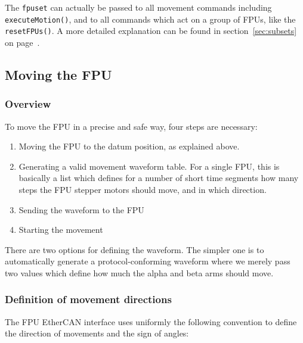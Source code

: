 \documentclass[11pt,a4paper]{report}
\begin{document}
The \texttt{fpuset} can actually be passed to all movement commands
including \texttt{executeMotion()}, and to all commands which act on a
group of FPUs, like the \texttt{resetFPUs()}. A more detailed
explanation can be found in section~\ref{sec:subsets} on
page~\pageref{sec:subsets}.


\subsection{Moving the FPU}
\subsubsection{Overview}
To move the FPU in a precise and safe way, four steps are necessary:

\begin{enumerate}
\item Moving the FPU to the datum position, as explained above.

\item Generating a valid movement waveform table. For a single FPU,
  this is basically a list which defines for a number of short time
  segments how many steps the FPU stepper motors should move, and in
  which direction.

\item Sending the waveform to the FPU
\item Starting the movement
  
\end{enumerate}

There are two options for defining the waveform. The simpler one is to
automatically generate a protocol-conforming waveform where we merely
pass two values which define how much the alpha and beta arms should
move.

\subsubsection{Definition of movement directions}

The FPU EtherCAN interface uses uniformly the following convention
to define the direction of movements and the sign of
angles:
\end{document}
